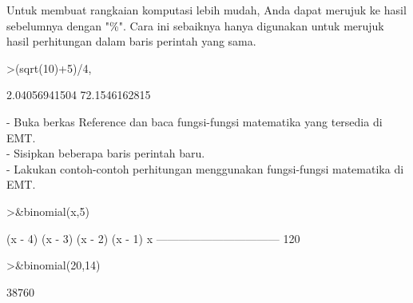 \documentclass[a4paper,10pt]{article}
\begin{document}
\begin{eulernotebook}
\begin{eulercomment}
\begin{eulercomment}
\begin{eulercomment}
\begin{eulercomment}
\begin{eulercomment}
Untuk membuat rangkaian komputasi lebih mudah, Anda dapat merujuk ke hasil
sebelumnya dengan "\%". Cara ini sebaiknya hanya digunakan untuk merujuk hasil
perhitungan dalam baris perintah yang sama.
\end{eulercomment}
\begin{eulerprompt}
>(sqrt(10)+5)/4, %
\end{eulerprompt}
\begin{euleroutput}
  2.04056941504
  72.1546162815
\end{euleroutput}
\begin{eulercomment}
- Buka berkas Reference dan baca fungsi-fungsi matematika yang
tersedia di EMT.\\
- Sisipkan beberapa baris perintah baru.\\
- Lakukan contoh-contoh perhitungan menggunakan fungsi-fungsi
matematika di EMT.\\
\end{eulercomment}
\eulersubheading{}
\begin{eulercomment}
\end{eulercomment}
\begin{eulerprompt}
>&binomial(x,5)
\end{eulerprompt}
\begin{euleroutput}
  
                    (x - 4) (x - 3) (x - 2) (x - 1) x
                    ---------------------------------
                                   120
  
\end{euleroutput}
\begin{eulerprompt}
>&binomial(20,14)
\end{eulerprompt}
\begin{euleroutput}
  
                                  38760
  

\end{euleroutput}
\end{eulercomment}
\end{eulercomment}
\end{eulercomment}
\end{eulercomment}
\end{eulernotebook}
\end{document}
